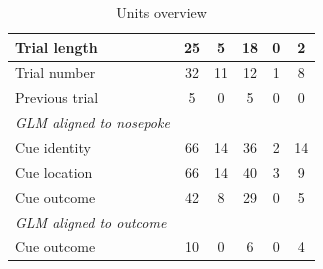 \documentclass[11pt]{article}
\begin{document}
\begin{table}
\begin{tabular}{l c  c c c c}
\hline
\hspace{6mm}Trial length       & 25        & 5          & 18         & 0         & 2\\
\hline
\hspace{6mm}Trial number       & 32         & 11          & 12         & 1          & 8\\
\hline
\hspace{6mm}Previous trial       & 5         & 0          &5          & 0          & 0\\
\hline
\hspace{3mm}\textit{GLM aligned to nosepoke}                       &         &       &          &          &\\
\hline
\hspace{6mm}Cue identity       & 66         &14          & 36          & 2          &14\\
\hline
\hspace{6mm}Cue location       & 66         &14          & 40          & 3          & 9\\
\hline
\hspace{6mm}Cue outcome       & 42        & 8          & 29        & 0          & 5\\
\hline
\hspace{3mm}\textit{GLM aligned to outcome}                       &         &       &          &          &\\
\hline
\hspace{6mm}Cue outcome       & 10        & 0          & 6       & 0          &4\\
\hline

\end{tabular}
\caption {Units overview} \label{tbl1} 
\end{table}
\end{document}
